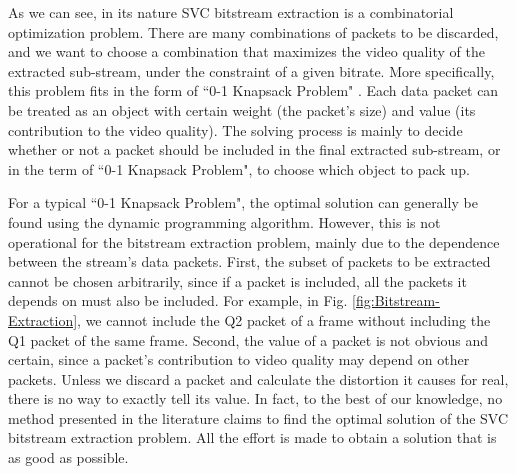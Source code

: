 \documentclass[journal]{IEEEtran}
\begin{document}
As we can see, in its nature SVC bitstream extraction is a combinatorial optimization problem. There are many combinations of packets to be discarded, and we want to choose a combination that maximizes the video quality of the extracted sub-stream, under the constraint of a given bitrate. More specifically, this problem fits in the form of ``0-1 Knapsack Problem" \cite{Knapsack}. Each data packet can be treated as an object with certain weight (the packet's size) and value (its contribution to the video quality). The solving process is mainly to decide whether or not a packet should be included in the final extracted sub-stream, or in the term of ``0-1 Knapsack Problem", to choose which object to pack up.

For a typical ``0-1 Knapsack Problem", the optimal solution can generally be found using the dynamic programming algorithm. However, this is not operational for the bitstream extraction problem, mainly due to the dependence between the stream's data packets. First, the subset of packets to be extracted cannot be chosen arbitrarily, since if a packet is included, all the packets it depends on must also be included. For example, in Fig. \ref{fig:Bitstream-Extraction}, we cannot include the Q2 packet of a frame without including the Q1 packet of the same frame. Second, the value of a packet is not obvious and certain, since a packet's contribution to video quality may depend on other packets. Unless we discard a packet and calculate the distortion it causes for real, there is no way to exactly tell its value. In fact, to the best of our knowledge, no method presented in the literature claims to find the optimal solution of the SVC bitstream extraction problem. All the effort is made to obtain a solution that is as good as possible.
\end{document}
